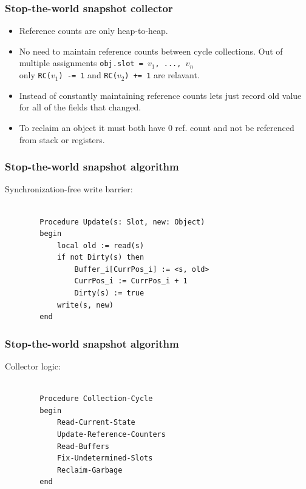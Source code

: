 \begin{frame}
    \frametitle{Stop-the-world snapshot collector}
    \begin{itemize}
        \item
            Reference counts are only heap-to-heap.
        \item
            No need to maintain reference counts between cycle collections.
            Out of multiple assignments \texttt{obj.slot = $v_1$, ..., $v_n$}
            \\ only \texttt{RC($v_1$) -= 1} and \texttt{RC($v_2$) += 1}
            are relavant.
        \item
            Instead of constantly maintaining reference counts lets
            just record old value for all of the fields that changed.
        \item
            To reclaim an object it must both have 0 ref. count and not
            be referenced from stack or registers.
    \end{itemize}
\end{frame}

\begin{frame}[fragile]
    \frametitle{Stop-the-world snapshot algorithm}
    Synchronization-free write barrier:
    \begin{verbatim}

        Procedure Update(s: Slot, new: Object)
        begin
            local old := read(s)
            if not Dirty(s) then
                Buffer_i[CurrPos_i] := <s, old>
                CurrPos_i := CurrPos_i + 1
                Dirty(s) := true
            write(s, new)
        end
    \end{verbatim}
\end{frame}

\begin{frame}[fragile]
    \frametitle{Stop-the-world snapshot algorithm}
    Collector logic:
    \begin{verbatim}

        Procedure Collection-Cycle
        begin
            Read-Current-State
            Update-Reference-Counters
            Read-Buffers
            Fix-Undetermined-Slots
            Reclaim-Garbage
        end
    \end{verbatim}
\end{frame}

